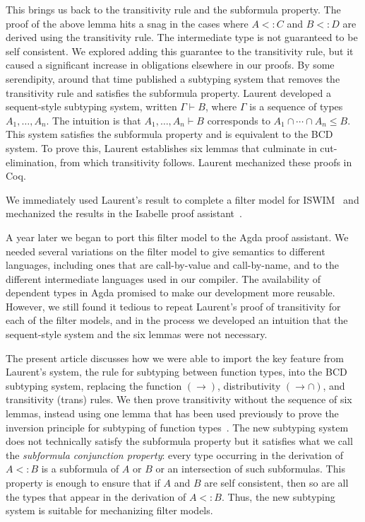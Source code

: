 \documentclass{article}
\begin{document}
This brings us back to the transitivity rule and the subformula
property. The proof of the above lemma hits a snag in the cases where
$A <: C$ and $B <: D$ are derived using the transitivity rule. The
intermediate type is not guaranteed to be self consistent. We explored
adding this guarantee to the transitivity rule, but it caused a
significant increase in obligations elsewhere in our proofs. By some
serendipity, around that time \citet{Laurent:2018aa} published a
subtyping system that removes the transitivity rule and satisfies the
subformula property.  Laurent developed a sequent-style subtyping
system, written $\Gamma \vdash B$, where $\Gamma$ is a sequence of
types $A_1,\ldots,A_n$. The intuition is that $A_1,\ldots,A_n \vdash
B$ corresponds to $A_1 \cap \cdots \cap A_n \leq B$. This system
satisfies the subformula property and is equivalent to the BCD
system. To prove this, Laurent establishes six lemmas that culminate
in cut-elimination, from which transitivity follows. Laurent
mechanized these proofs in Coq.

We immediately used Laurent's result to complete a filter model for
ISWIM~\citep{Landin:1966la,G.-D.-Plotkin:1975on,Felleisen:2009aa} and
mechanized the results in the Isabelle proof
assistant~\citep{Siek:2018aa}.

A year later we began to port this filter model to the Agda proof
assistant. We needed several variations on the filter model to give
semantics to different languages, including ones that are
call-by-value and call-by-name, and to the different intermediate
languages used in our compiler.  The availability of dependent types
in Agda promised to make our development more reusable.  However, we
still found it tedious to repeat Laurent's proof of transitivity for
each of the filter models, and in the process we developed an
intuition that the sequent-style system and the six lemmas were not
necessary.

The present article discusses how we were able to import the key
feature from Laurent's system, the rule for subtyping between function
types, into the BCD subtyping system, replacing the function $(\to)$,
distributivity $({\to}{\cap})$, and transitivity (trans) rules.  We
then prove transitivity without the sequence of six lemmas, instead
using one lemma that has been used previously to prove the inversion
principle for subtyping of function
types~\citep{Barendregt:2013aa}. The new subtyping system does not
technically satisfy the subformula property but it satisfies what we
call the \emph{subformula conjunction property}: every type occurring
in the derivation of $A <: B$ is a subformula of $A$ or $B$ or an
intersection of such subformulas.  This property is enough to ensure
that if $A$ and $B$ are self consistent, then so are all the types
that appear in the derivation of $A <: B$.  Thus, the new subtyping
system is suitable for mechanizing filter models.
\end{document}
